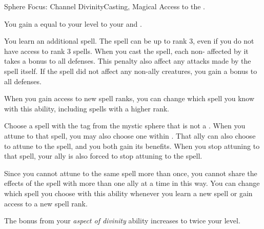     \begin{magicalfeat}{Sphere Focus: Channel Divinity}{Casting, Magical}
        \featpre Access to the  .

         You gain a  equal to your level to your  and .

         You learn an additional spell.
        The spell can be up to rank 3, even if you do not have access to rank 3 spells.
        When you cast the spell, each non- affected by it  takes a  bonus to all defenses.
        This penalty also affect any attacks made by the spell itself.
        If the spell did not affect any non-ally creatures, you  gain a  bonus to all defenses.

        When you gain access to new spell ranks, you can change which spell you know with this ability, including spells with a higher rank.

         Choose a spell with the  tag from the  mystic sphere that is not a .
        When you attune to that spell, you may also choose one  within \medrange.
        That ally can also choose to attune to the spell, and you both gain its benefits.
        When you stop attuning to that spell, your ally is also forced to stop attuning to the spell.

        Since you cannot attune to the same spell more than once, you cannot share the effects of the spell with more than one ally at a time in this way.
        You can change which spell you choose with this ability whenever you learn a new spell or gain access to a new spell rank.

         The bonus from your \textit{aspect of divinity} ability increases to twice your level.
    \end{magicalfeat}

